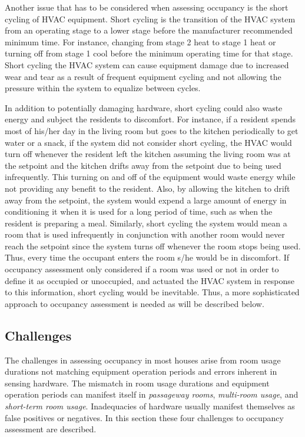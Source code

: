 
Another issue that has to be considered when assessing occupancy is the short
cycling of HVAC equipment. Short cycling is the transition of the HVAC system
from an operating stage to a lower stage before the manufacturer recommended
minimum time. For instance, changing from stage 2 heat to stage 1 heat or
turning off from stage 1 cool before the minimum operating time for that
stage. Short cycling the HVAC system can cause equipment damage due to increased
wear and tear as a result of frequent equipment cycling and not allowing the
pressure within the system to equalize between cycles. 

In addition to potentially damaging hardware, short cycling could also waste
energy and subject the residents to discomfort. For instance, if a resident
spends most of his/her day in the living room but goes to the kitchen
periodically to get water or a snack, if the system did not consider short
cycling, the HVAC would turn off whenever the resident left the kitchen assuming
the living room was at the setpoint and the kitchen drifts away from the
setpoint due to being used infrequently. This turning on and off of the
equipment would waste energy while not providing any benefit to the
resident. Also, by allowing the kitchen to drift away from the setpoint, the
system would expend a large amount of energy in conditioning it when it is
used for a long period of time, such as when the resident is preparing a
meal. Similarly, short cycling the system would mean a room that is used
infrequently in conjunction with another room would never reach the setpoint
since the system turns off whenever the room stops being used. Thus, every time
the occupant enters the room s/he would be in discomfort. If occupancy
assessment only considered if a room was used or not in order to define it as
occupied or unoccupied, and actuated the HVAC system in response to this
information, short cycling would be inevitable. Thus, a more sophisticated
approach to occupancy assessment is needed as will be described below.

\subsection{Challenges}
\label{sec:occupancyAssessmentChallenges}

The challenges in assessing occupancy in most houses arise from room usage
durations not matching equipment operation periods and errors inherent in
sensing hardware. The mismatch in room usage durations and equipment operation
periods can manifest itself in {\em passageway rooms}, {\em multi-room usage},
and {\em short-term room usage}. Inadequacies of hardware usually manifest
themselves as false positives or negatives. In this section these four
challenges to occupancy assessment are described.

